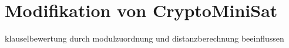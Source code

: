 \chapter{Modifikation von CryptoMiniSat}
\label{chp:modification}

klauselbewertung durch modulzuordnung und distanzberechnung beeinflussen

